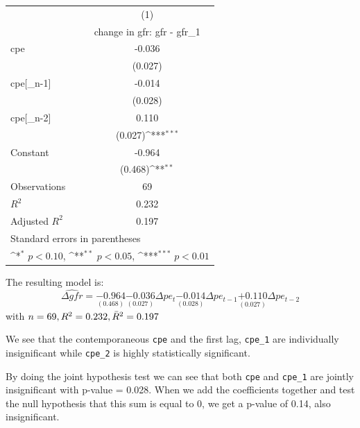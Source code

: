 \documentclass[11pt]{article}
\begin{document}
\begin{center}
    {
\def\sym#1{\ifmmode^{#1}\else\(^{#1}\)\fi}
\begin{tabular}{l*{1}{c}}
\toprule
                    &\multicolumn{1}{c}{(1)}\\
                    &\multicolumn{1}{c}{change in gfr:  gfr - gfr\_1}\\
\midrule
cpe           &      -0.036         \\
                    &     (0.027)         \\
\addlinespace
cpe[\_n-1]           &      -0.014         \\
                    &     (0.028)         \\
\addlinespace
cpe[\_n-2]           &       0.110         \\
                    &     (0.027)\sym{***}\\
\addlinespace
Constant            &      -0.964         \\
                    &     (0.468)\sym{**} \\
\midrule
Observations        &          69         \\
\(R^{2}\)           &       0.232         \\
Adjusted \(R^{2}\)  &       0.197         \\
\bottomrule
\multicolumn{2}{l}{\footnotesize Standard errors in parentheses}\\
\multicolumn{2}{l}{\footnotesize \sym{*} \(p<0.10\), \sym{**} \(p<0.05\), \sym{***} \(p<0.01\)}\\
\end{tabular}
}
\end{center}

The resulting model is:
\[\widehat{\Delta gfr} = \underset{(0.468)}{-0.964} \underset{(0.027)}{-0.036} \Delta pe_t \underset{(0.028)}{-0.014} \Delta pe_{t-1} \underset{(0.027)}{+0.110} \Delta pe_{t-2}\]
with $n = 69, R^2 = 0.232, \Bar{R}^2=0.197$

We see that the contemporaneous \lstinline{cpe} and the first lag, \lstinline{cpe_1} are individually insignificant while \lstinline{cpe_2} is highly statistically significant.

By doing the joint hypothesis test we can see that both \lstinline{cpe} and \lstinline{cpe_1} are jointly insignificant with p-value = 0.028. When we add the coefficients together and test the null hypothesis that this sum is equal to 0, we get a p-value of 0.14, also insignificant.
\end{document}
